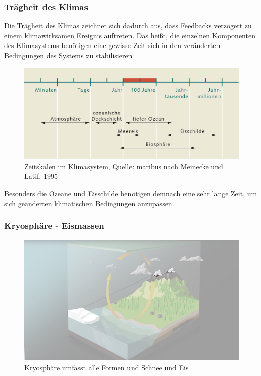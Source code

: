 \begin{frame}
	\frametitle{Trägheit des Klimas}
	Die Trägheit des Klimas zeichnet sich dadurch aus, dass Feedbacks verzögert zu einem klimawirksamen Ereignis auftreten. Das heißt, die einzelnen Komponenten des Klimasystems benötigen eine gewisse Zeit sich in den veränderten Bedingungen des Systems zu stabilisieren
	
	
	\begin{figure}
		\centering
		\includegraphics[width=0.8\linewidth]{bilder/zeitskala-klimasystem_world_ocean_review.jpg}
		\caption{Zeitskalen im Klimasystem, Quelle: maribus nach Meinecke und Latif, 1995}
	\end{figure}
	
	Besonders die Ozeane und Eisschilde benötigen demnach eine sehr lange Zeit, um sich geänderten klimatischen Bedingungen anzupassen.
\end{frame}

\begin{frame}
	\frametitle{Kryosphäre - Eismassen}
	
	\begin{figure}
		\centering
		\includegraphics{bilder/WMO_Cycles_ice.png}
		\caption{Kryosphäre umfasst alle Formen und Schnee und Eis}
	\end{figure}
\end{frame}

